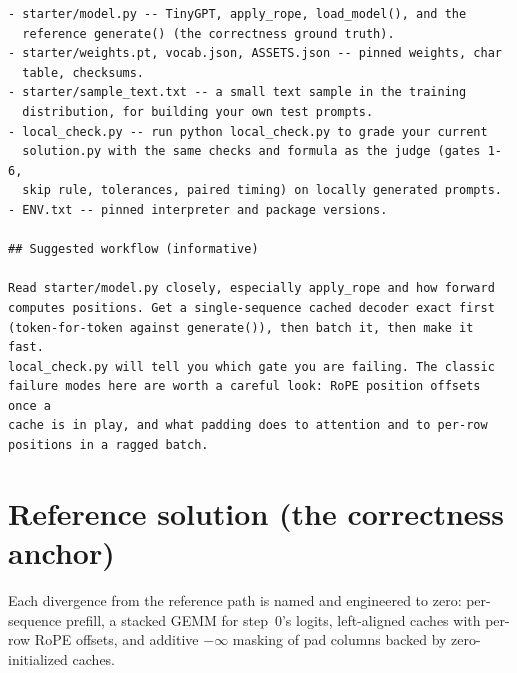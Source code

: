 \documentclass[11pt]{article}
\begin{document}
\begin{lstlisting}[style=plain]
- starter/model.py -- TinyGPT, apply_rope, load_model(), and the
  reference generate() (the correctness ground truth).
- starter/weights.pt, vocab.json, ASSETS.json -- pinned weights, char
  table, checksums.
- starter/sample_text.txt -- a small text sample in the training
  distribution, for building your own test prompts.
- local_check.py -- run python local_check.py to grade your current
  solution.py with the same checks and formula as the judge (gates 1-6,
  skip rule, tolerances, paired timing) on locally generated prompts.
- ENV.txt -- pinned interpreter and package versions.

## Suggested workflow (informative)

Read starter/model.py closely, especially apply_rope and how forward
computes positions. Get a single-sequence cached decoder exact first
(token-for-token against generate()), then batch it, then make it fast.
local_check.py will tell you which gate you are failing. The classic
failure modes here are worth a careful look: RoPE position offsets once a
cache is in play, and what padding does to attention and to per-row
positions in a ragged batch.
\end{lstlisting}

\section{Reference solution (the correctness anchor)}
\label{app:gold}

Each divergence from the reference path is named and engineered to zero: per-sequence
prefill, a stacked GEMM for step~0's logits, left-aligned caches with per-row RoPE
offsets, and additive $-\infty$ masking of pad columns backed by zero-initialized
caches.
\end{document}
